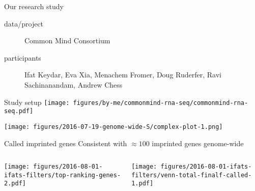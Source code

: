 \documentclass{beamer}
\begin{document}
\begin{frame}[label=our-study]{Our research study}
\begin{description}
\item[data/project] Common Mind Consortium
\item[participants] \alert{Ifat Keydar}, Eva Xia, Menachem Fromer, Doug Ruderfer, Ravi Sachinanandam, Andrew Chess
\end{description}
\end{frame}

\begin{frame}[label=cmc]{Study setup}
\texttt{[image: figures/by-me/commonmind-rna-seq/commonmind-rna-seq.pdf]}
\end{frame}

\begin{frame}[t, plain]
\begin{center}
\texttt{[image: figures/2016-07-19-genome-wide-S/complex-plot-1.png]}
\end{center}
\end{frame}

\begin{frame}[label=filtering-calling]{Called imprinted genes}
{Consistent with \(\approx100\) imprinted genes genome-wide}
\begin{columns}[t]
\begin{column}{0.5\textwidth}

\texttt{[image: figures/2016-08-01-ifats-filters/top-ranking-genes-2.pdf]}
\end{column}

\begin{column}{0.5\textwidth}

\texttt{[image: figures/2016-08-01-ifats-filters/venn-total-finalf-called-1.pdf]}
\end{column}
\end{columns}
\end{frame}
\end{document}
